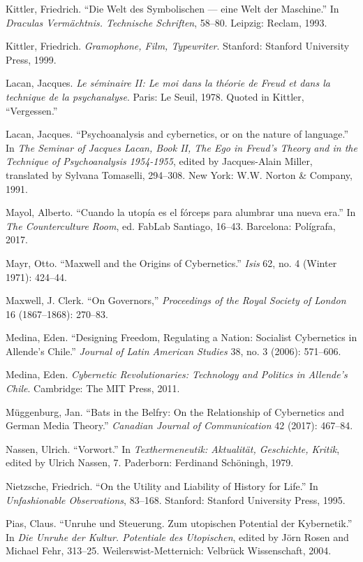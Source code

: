 \documentclass{tufte-handout}
\begin{document}
\begin{hangparas}{.25in}{1}
Kittler, Friedrich. ``Die Welt des Symbolischen --- eine Welt der
Maschine.'' In \emph{Draculas Vermächtnis. Technische Schriften},
58--80. Leipzig: Reclam, 1993.

Kittler, Friedrich. \emph{Gramophone, Film, Typewriter}. Stanford:
Stanford University Press, 1999.

Lacan, Jacques. \emph{Le séminaire II: Le moi dans la théorie de Freud
et dans la technique de la psychanalyse}. Paris: Le Seuil, 1978. Quoted
in Kittler, ``Vergessen.''

Lacan, Jacques. ``Psychoanalysis and cybernetics, or on the nature of
language.'' In \emph{The Seminar of Jacques Lacan, Book II, The Ego in
Freud's Theory and in the Technique of Psychoanalysis 1954-1955}, edited
by Jacques-Alain Miller, translated by Sylvana Tomaselli, 294--308. New
York: W.W. Norton \& Company, 1991.

Mayol, Alberto. ``Cuando la utopía es el fórceps para alumbrar una nueva
era.'' In \emph{The Counterculture Room}, ed. FabLab Santiago, 16--43.
Barcelona: Polígrafa, 2017.

Mayr, Otto. ``Maxwell and the Origins of Cybernetics.'' \emph{Isis} 62,
no. 4 (Winter 1971): 424--44.

Maxwell, J. Clerk. ``On Governors,'' \emph{Proceedings of the Royal
Society of London} 16 (1867--1868): 270--83.

Medina, Eden. ``Designing Freedom, Regulating a Nation: Socialist
Cybernetics in Allende's Chile.'' \emph{Journal of Latin American
Studies} 38, no. 3 (2006): 571--606.

Medina, Eden. \emph{Cybernetic Revolutionaries: Technology and Politics
in Allende's Chile}. Cambridge: The MIT Press, 2011.

Müggenburg, Jan. ``Bats in the Belfry: On the Relationship of
Cybernetics and German Media Theory.'' \emph{Canadian Journal of
Communication} 42 (2017): 467--84.

Nassen, Ulrich. ``Vorwort.'' In \emph{Texthermeneutik: Aktualität,
Geschichte, Kritik}, edited by Ulrich Nassen, 7. Paderborn: Ferdinand
Schöningh, 1979.

Nietzsche, Friedrich. ``On the Utility and Liability of History for
Life.'' In \emph{Unfashionable Observations}, 83--168. Stanford:
Stanford University Press, 1995.

Pias, Claus. ``Unruhe und Steuerung. Zum utopischen Potential der
Kybernetik.'' In \emph{Die Unruhe der Kultur. Potentiale des
Utopischen}, edited by Jörn Rosen and Michael Fehr, 313--25.
Weilerswist-Metternich: Velbrück Wissenschaft, 2004.


\end{hangparas}
\end{document}
